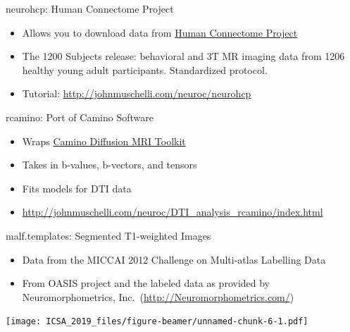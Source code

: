 \documentclass[ignorenonframetext,]{beamer}
\providecommand{\tightlist}{%
  \setlength{\itemsep}{0pt}\setlength{\parskip}{0pt}}
\begin{document}
\begin{frame}{neurohcp: Human Connectome Project}
\protect\hypertarget{neurohcp-human-connectome-project}{}

\begin{itemize}
\tightlist
\item
  Allows you to download data from
  \href{https://www.humanconnectome.org/}{Human Connectome Project}
\item
  The 1200 Subjects release: behavioral and 3T MR imaging data from 1206
  healthy young adult participants. Standardized protocol.
\item
  Tutorial: \url{http://johnmuschelli.com/neuroc/neurohcp}
\end{itemize}

\end{frame}

\begin{frame}{rcamino: Port of Camino Software}
\protect\hypertarget{rcamino-port-of-camino-software}{}

\begin{itemize}
\tightlist
\item
  Wraps \href{http://camino.cs.ucl.ac.uk/}{Camino Diffusion MRI Toolkit}
\item
  Takes in b-values, b-vectors, and tensors
\item
  Fits models for DTI data
\item
  \url{http://johnmuschelli.com/neuroc/DTI_analysis_rcamino/index.html}
\end{itemize}

\end{frame}

\begin{frame}{malf.templates: Segmented T1-weighted Images}
\protect\hypertarget{malf.templates-segmented-t1-weighted-images}{}

\begin{itemize}
\tightlist
\item
  Data from the MICCAI 2012 Challenge on Multi-atlas Labelling Data
\item
  From OASIS project and the labeled data as provided by
  Neuromorphometrics, Inc.~(\url{http://Neuromorphometrics.com/})
\end{itemize}

\texttt{[image: ICSA\_2019\_files/figure-beamer/unnamed-chunk-6-1.pdf]}

\end{frame}
\end{document}
